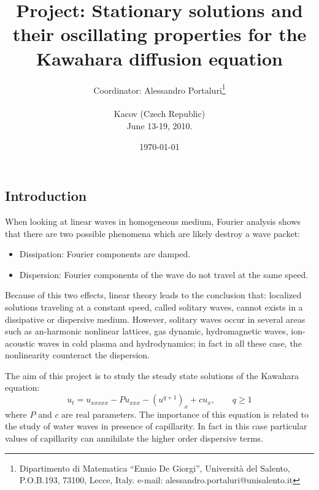 \documentclass[11pt,oneside,letterpaper,leqno,final]{article}
\title{Project: Stationary solutions and their oscillating properties for the Kawahara diffusion equation}
\author{Coordinator: Alessandro Portaluri\footnote{Dipartimento di Matematica ``Ennio De
Giorgi'', Universit\`a del Salento, P.O.B.193, 73100, Lecce, Italy.
e-mail: alessandro.portaluri@unisalento.it}\\
 \\
Kacov (Czech Republic)\\
June 13-19, 2010.}
\date{\today}
\begin{document}
\maketitle

\subsection*{Introduction}
    When looking at linear waves in homogeneous medium, Fourier analysis
    shows that there are two possible phenomena which are likely destroy
    a wave packet:
\begin{itemize}
\item Dissipation: Fourier components are damped.
\item Dispersion: Fourier components of the wave do not travel at
the same speed.
\end{itemize}
Because of this two effects, linear theory leads to the conclusion that: localized solutions traveling at a
constant speed, called solitary waves, cannot exists in a
dissipative or dispersive medium. However, solitary waves occur in
several areas such as an-harmonic nonlinear lattices, gas dynamic,
hydromagnetic waves, ion-acoustic waves in cold plasma and
hydrodynamics; in fact in all these case, the nonlinearity counteract the dispersion.

\noindent
The aim of this project is to study the steady state
solutions of the Kawahara equation:
\[
u_t=u_{xxxxx}-Pu_{xxx}-(u^{q+1})_x +c u_x, \qquad q \geq 1
\]
where $P$ and $ c$ are real parameters. The importance of this equation is related
to the study of water waves in presence of
capillarity. In fact in this case particular values of capillarity can annihilate
the higher order dispersive terms.


\end{document}
